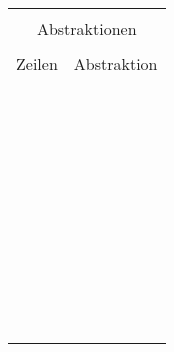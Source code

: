 \begin{tabular}{|p{2.5cm}|p{12.5cm}|}\hline
	\multicolumn{2}{|c|}{}\\ 
	\multicolumn{2}{|c|}{Abstraktionen}\\ \hline
	        & \\
	Zeilen   & Abstraktion  \\ \hline
	 & \\
	 & \\
	 & \\
	 & \\
	 & \\
	 & \\
	 & \\
	 & \\
	 & \\
	 & \\
	 & \\
	 & \\
	 & \\
	 & \\
	 & \\
	 & \\
	 & \\
	 & \\
	 & \\
	 & \\
	 & \\
	 & \\
	 & \\
	 & \\
	 & \\
	 & \\
	 & \\
	 & \\
	 & \\
	 & \\
	 & \\
	 & \\
	 & \\
	 & \\
	 & \\
	 & \\
	 & \\
	 & \\
	 & \\
	 & \\
	 & \\
	 & \\
	 & \\
	 & \\ \hline
\end{tabular}

